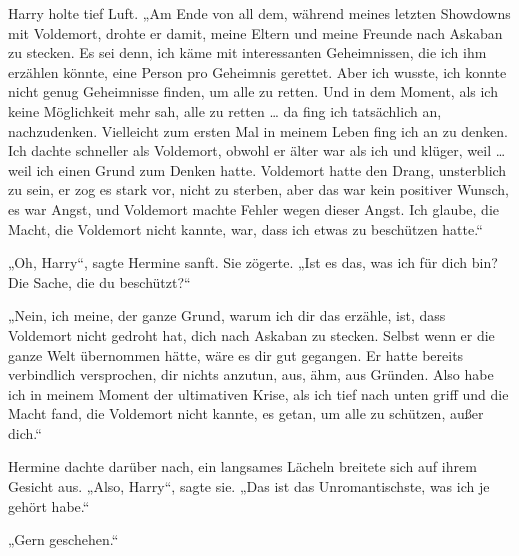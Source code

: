 Harry holte tief Luft.
„Am Ende von all dem, während meines letzten Showdowns mit Voldemort, drohte er damit, meine Eltern und meine Freunde nach Askaban zu stecken. Es sei denn, ich käme mit interessanten Geheimnissen, die ich ihm erzählen könnte, eine Person pro Geheimnis gerettet. Aber ich wusste, ich konnte nicht genug Geheimnisse finden, um alle zu retten. Und in dem Moment, als ich keine Möglichkeit mehr sah, alle zu retten … da fing ich tatsächlich an, nachzudenken. Vielleicht zum ersten Mal in meinem Leben fing ich an zu denken. Ich dachte schneller als Voldemort, obwohl er älter war als ich und klüger, weil … weil ich einen Grund zum Denken hatte. Voldemort hatte den Drang, unsterblich zu sein, er zog es stark vor, nicht zu sterben, aber das war kein positiver Wunsch, es war Angst, und Voldemort machte Fehler wegen dieser Angst. Ich glaube, die Macht, die Voldemort nicht kannte, war, dass ich etwas zu beschützen hatte.“

„Oh, Harry“, sagte Hermine sanft.
Sie zögerte.
„Ist es das, was ich für dich bin? Die Sache, die du beschützt?“

„Nein, ich meine, der ganze Grund, warum ich dir das erzähle, ist, dass Voldemort nicht gedroht hat, dich nach Askaban zu stecken. Selbst wenn er die ganze Welt übernommen hätte, wäre es dir gut gegangen. Er hatte bereits verbindlich versprochen, dir nichts anzutun, aus, ähm, aus Gründen. Also habe ich in meinem Moment der ultimativen Krise, als ich tief nach unten griff und die Macht fand, die Voldemort nicht kannte, es getan, um alle zu schützen, außer dich.“

Hermine dachte darüber nach, ein langsames Lächeln breitete sich auf ihrem Gesicht aus.
„Also, Harry“, sagte sie.
„Das ist das Unromantischste, was ich je gehört habe.“

„Gern geschehen.“

